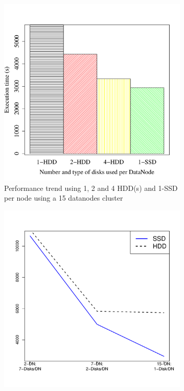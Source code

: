 \documentclass[conference]{IEEEtran}
\begin{document}
\begin{figure}[h]
  \centering
  \begin{subfigure}[b]{0.23\textwidth}
          \includegraphics[width=\textwidth]{Figure/PerormanceData/Plots/SSDHDDSameNode.pdf}
          \caption{Performance trend using 1, 2 and 4 HDD(s) and 1-SSD per node using a 15 datanodes cluster}
          \label{fig:SsdN4Hdd}
  \end{subfigure}
  \begin{subfigure}[b]{0.23\textwidth}
          \includegraphics[width=\textwidth]{Figure/PerormanceData/Plots/SSDHDDDiffNode.pdf}

\end{subfigure}
\end{figure}
\end{document}
